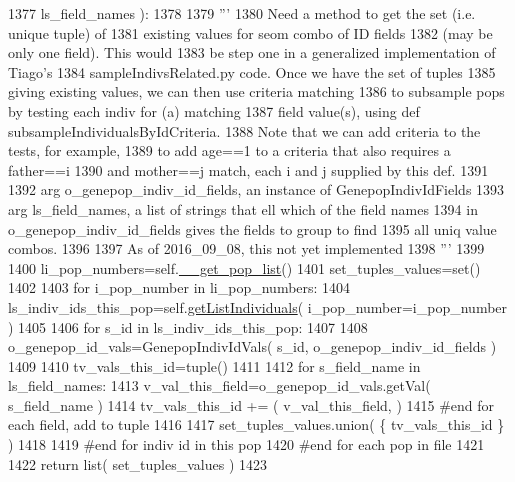 \begin{DoxyCode}
1377                             ls\_field\_names ):
1378 
1379         \textcolor{stringliteral}{'''}
1380 \textcolor{stringliteral}{        Need a method to get the set (i.e. unique tuple) of }
1381 \textcolor{stringliteral}{        existing values for seom combo of ID fields }
1382 \textcolor{stringliteral}{        (may be only one field).  This would }
1383 \textcolor{stringliteral}{        be step one in a generalized implementation of Tiago's }
1384 \textcolor{stringliteral}{        sampleIndivsRelated.py code. Once we have the set of tuples }
1385 \textcolor{stringliteral}{        giving existing values, we can then use criteria matching }
1386 \textcolor{stringliteral}{        to subsample pops by testing each indiv for (a) matching }
1387 \textcolor{stringliteral}{        field value(s), using def subsampleIndividualsByIdCriteria.  }
1388 \textcolor{stringliteral}{        Note that we can add criteria to the tests, for example, }
1389 \textcolor{stringliteral}{        to add age==1 to a criteria that also requires a father==i }
1390 \textcolor{stringliteral}{        and mother==j match, each i and j supplied by this def.}
1391 \textcolor{stringliteral}{}
1392 \textcolor{stringliteral}{        arg o\_genepop\_indiv\_id\_fields, an instance of GenepopIndivIdFields}
1393 \textcolor{stringliteral}{        arg ls\_field\_names, a list of strings that ell which of the field names}
1394 \textcolor{stringliteral}{                in o\_genepop\_indiv\_id\_fields gives the fields to group to find}
1395 \textcolor{stringliteral}{                all uniq value combos.}
1396 \textcolor{stringliteral}{}
1397 \textcolor{stringliteral}{        As of 2016\_09\_08, this not yet implemented}
1398 \textcolor{stringliteral}{        '''}
1399 
1400         li\_pop\_numbers=self.\hyperlink{classnegui_1_1genepopfilemanager_1_1GenepopFileManager_a0cd3178624c652968b4d319f12e5df6e}{\_\_get\_pop\_list}() 
1401         set\_tuples\_values=set()
1402 
1403         \textcolor{keywordflow}{for} i\_pop\_number \textcolor{keywordflow}{in} li\_pop\_numbers:
1404             ls\_indiv\_ids\_this\_pop=self.\hyperlink{classnegui_1_1genepopfilemanager_1_1GenepopFileManager_aa6993dde24163002aeae55005437711d}{getListIndividuals}( i\_pop\_number=i\_pop\_number )
1405 
1406             \textcolor{keywordflow}{for} s\_id \textcolor{keywordflow}{in} ls\_indiv\_ids\_this\_pop:
1407 
1408                 o\_genepop\_id\_vals=GenepopIndivIdVals( s\_id, o\_genepop\_indiv\_id\_fields )
1409 
1410                 tv\_vals\_this\_id=tuple() 
1411 
1412                 \textcolor{keywordflow}{for} s\_field\_name \textcolor{keywordflow}{in} ls\_field\_names:
1413                     v\_val\_this\_field=o\_genepop\_id\_vals.getVal( s\_field\_name )
1414                     tv\_vals\_this\_id += ( v\_val\_this\_field, )
1415                 \textcolor{comment}{#end for each field, add to tuple}
1416 
1417                 set\_tuples\_values.union( \{ tv\_vals\_this\_id \} )
1418 
1419             \textcolor{comment}{#end for indiv id in this pop}
1420         \textcolor{comment}{#end for each pop in file}
1421 
1422         \textcolor{keywordflow}{return} list( set\_tuples\_values )
1423 
\end{DoxyCode}
